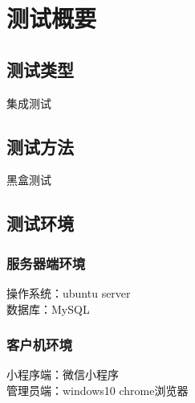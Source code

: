\chapter{测试概要}

\section{测试类型}
集成测试
\section{测试方法}
黑盒测试
\section{测试环境}
\subsection{服务器端环境}
操作系统：ubuntu server \\
数据库：MySQL
\subsection{客户机环境}
小程序端：微信小程序 \\
管理员端：windows10 chrome浏览器